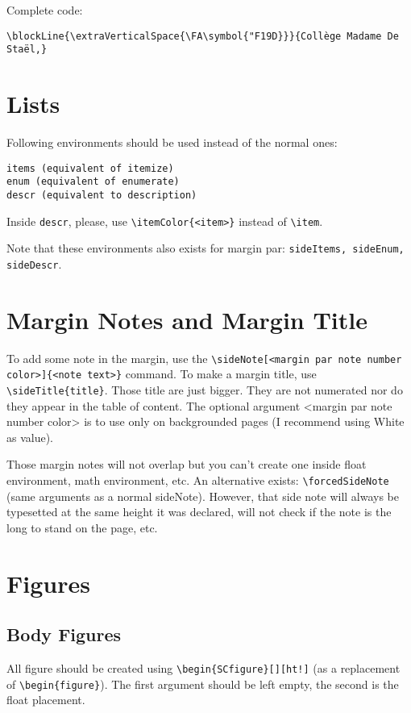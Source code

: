 \documentclass[a4paper, 11pt, oneside, fleqn]{article}
\begin{document}
	Complete code:
	\begin{lstlisting}
\blockLine{\extraVerticalSpace{\FA\symbol{"F19D}}}{Collège Madame De Staël,}
	\end{lstlisting}
	
	
	\section{Lists}
	Following environments should be used instead of the normal ones:
	\begin{lstlisting}
items (equivalent of itemize)
enum (equivalent of enumerate)
descr (equivalent to description)
	\end{lstlisting}
	
	Inside \lstinline[breaklines]|descr|, please, use \lstinline[breaklines]|\itemColor{<item>}| instead of \lstinline[breaklines]|\item|.
	
	Note that these environments also exists for margin par: \lstinline[breaklines]|sideItems, sideEnum, sideDescr|.
	
	\section{Margin Notes and Margin Title}
	To add some note in the margin, use the \lstinline[breaklines]|\sideNote[<margin par note number color>]{<note text>}| command. To make a margin title, use \lstinline[breaklines]|\sideTitle{title}|. Those title are just bigger. They are not numerated nor do they appear in the table of content. The optional argument <margin par note number color> is to use only on backgrounded pages (I recommend using White as value).
	
	Those margin notes will not overlap but you can't create one inside float environment, math environment, etc. An alternative exists: \lstinline[breaklines]|\forcedSideNote| (same arguments as a normal sideNote). However, that side note will always be typesetted at the same height it was declared, will not check if the note is the long to stand on the page, etc.
	
	
	\section{Figures}
	\subsection{Body Figures}
	All figure should be created using \lstinline[breaklines]|\begin{SCfigure}[][ht!]| (as a replacement of \lstinline[breaklines]|\begin{figure}|). The first argument should be left empty, the second is the float placement.
	
\end{document}
